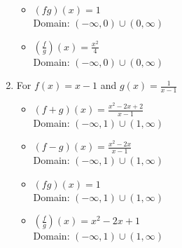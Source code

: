 \begin{enumerate}
\begin{multicols}{2}
\begin{itemize}

\item $(fg)(x) = 1$ \\
      Domain: $(-\infty,0) \cup (0, \infty)$
      
      \vfill
      
      \columnbreak
      
\item $\left(\frac{f}{g}\right)(x) = \frac{x^2}{4}$ \\
      Domain: $(-\infty,0) \cup (0, \infty)$


\end{itemize}

\end{multicols}



\item For   $f(x) =x-1$ and $g(x) = \frac{1}{x-1}$

\begin{multicols}{2}

\begin{itemize}

\item $(f+g)(x) = \frac{x^2-2x+2}{x-1}$ \\
      Domain: $(-\infty, 1) \cup (1, \infty)$
      
      \vfill
      
      \columnbreak
      
\item $(f-g)(x) = \frac{x^2-2x}{x-1}$ \\
      Domain:  $(-\infty,1) \cup (1, \infty)$


\end{itemize}

\end{multicols}

\begin{multicols}{2}

\begin{itemize}

\item $(fg)(x) = 1$ \\
      Domain: $(-\infty,1) \cup (1, \infty)$
      
      \vfill
      
      \columnbreak
      
\item $\left(\frac{f}{g}\right)(x) =x^2-2x+1$ \\
      Domain: $(-\infty,1) \cup (1, \infty)$



\end{itemize}
\end{multicols}
\end{enumerate}
